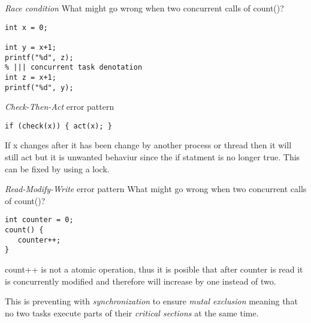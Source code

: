 \begin{exampleblock}{\textit{Race condition}}
  What might go wrong when two concurrent calls of count()?

\begin{verbatim}
int x = 0;

int y = x+1;
printf("%d", z);
% ||| concurrent task denotation
int z = x+1;
printf("%d", y);

\end{verbatim}
\end{exampleblock}


\begin{exampleblock}{\textit{Check-Then-Act} error pattern}

\begin{verbatim}
if (check(x)) { act(x); }
\end{verbatim}
  If x changes after it has been change by another process or thread then
  it will still act but it is unwanted behaviur since the if statment is no
  longer true. This can be fixed by using a lock.
\end{exampleblock}

  
\begin{exampleblock}{\textit{Read-Modify-Write} error pattern}
  What might go wrong when two concurrent calls of count()?
\begin{verbatim}
int counter = 0;
count() {
   counter++;
}
\end{verbatim}
  count++ is not a atomic operation, thus it is posible that after counter is read
  it is concurrently modified and therefore will increase by one instead of two.
\end{exampleblock}

This is preventing with \textit{synchronization} to ensure \textit{mutal exclusion} meaning that
no two tasks execute parts of their \textit{critical sections} at the same time.

